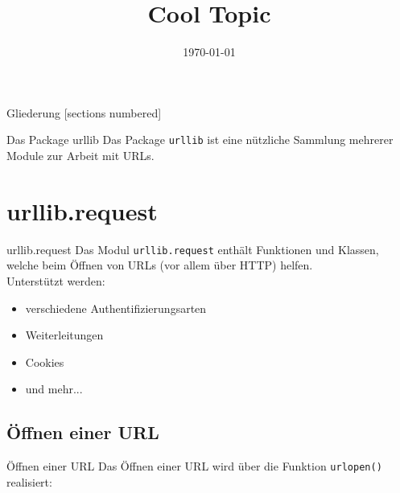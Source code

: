 



\title{Cool Topic}
\date{\today}




\maketitle

\begin{frame}{Gliederung}
	[sections numbered]
	\tableofcontents
\end{frame}


\begin{frame}[fragile]{Das Package urllib}
	Das Package \texttt{urllib} ist eine nützliche Sammlung mehrerer Module
	zur Arbeit mit URLs.
\end{frame}


\section{urllib.request}
\begin{frame}[fragile]{urllib.request}
	Das Modul \alert{\texttt{urllib.request}} enthält Funktionen und Klassen, welche
	beim Öffnen von URLs (vor allem über HTTP) helfen. \\[.5cm]
	Unterstützt werden:
	\begin{itemize}
		\item verschiedene Authentifizierungsarten
		\item Weiterleitungen
		\item Cookies
		\item und mehr...
	\end{itemize}
\end{frame}

\subsection{Öffnen einer URL}
\begin{frame}[fragile]{Öffnen einer URL}
	Das Öffnen einer URL wird über die Funktion \alert{\texttt{urlopen()}} realisiert:
	
\end{frame}

